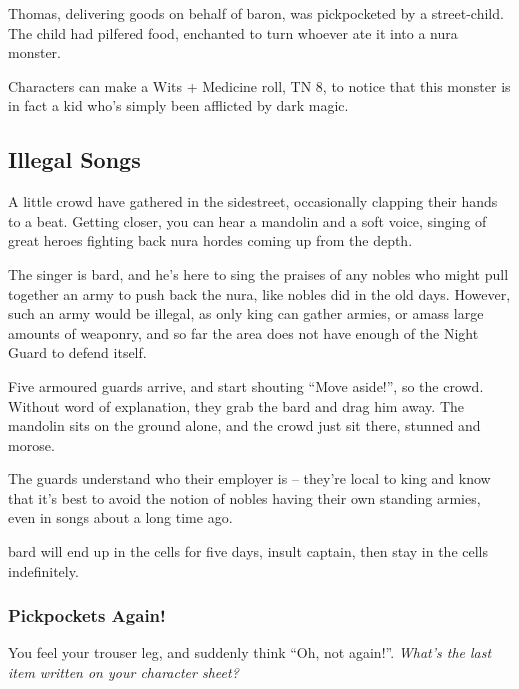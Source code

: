 Thomas, delivering goods on behalf of \gls{baron}, was pickpocketed by a street-child.  The child had pilfered food, enchanted to turn whoever ate it into a nura monster.

Characters can make a Wits + Medicine roll, TN 8, to notice that this monster is in fact a kid who's simply been afflicted by dark magic.

\deephobgoblin


\subsection{Illegal Songs}

\begin{boxtext}
	A little crowd have gathered in the sidestreet, occasionally clapping their hands to a beat.  Getting closer, you can hear a mandolin and a soft voice, singing of great heroes fighting back nura hordes coming up from the depth.
\end{boxtext}

The singer is \gls{bard}, and he's here to sing the praises of any nobles who might pull together an army to push back the nura, like nobles did in the old days.  However, such an army would be illegal, as only \gls{king} can gather armies, or amass large amounts of weaponry, and so far the area does not have enough of the Night Guard to defend itself.

\begin{boxtext}
	Five armoured guards arrive, and start shouting ``Move aside!'', so the crowd.  Without word of explanation, they grab the bard and drag him away.  The mandolin sits on the ground alone, and the crowd just sit there, stunned and morose.
\end{boxtext}

The guards understand who their employer is -- they're local to \gls{king} and know that it's best to avoid the notion of nobles having their own standing armies, even in songs about a long time ago.

\Gls{bard} will end up in the cells for five days, insult \gls{captain}, then stay in the cells indefinitely.

\subsubsection{Pickpockets Again!}
\begin{boxtext}
	You feel your trouser leg, and suddenly think ``Oh, not again!''.  \textit{What's the last item written on your character sheet?}
\end{boxtext}


